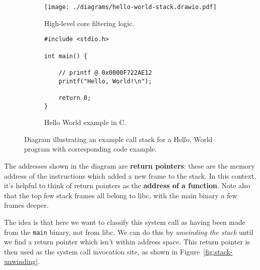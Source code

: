\begin{figure}[h]
    \centering %

    \begin{subfigure}[b]{0.48\linewidth} %
        \centering %
        \texttt{[image: ./diagrams/hello-world-stack.drawio.pdf]}
        \caption{High-level \afg core filtering logic.} %
        \label{subfig:stack-diagram} %
    \end{subfigure}
    \hfill %
    \begin{subfigure}[b]{0.48\linewidth} %
        \centering %
        \begin{verbatim}
#include <stdio.h>

int main() {

    // printf @ 0x0000F722AE12
    printf("Hello, World!\n");    

    return 0;
}
        \end{verbatim}
        \caption{Hello World example in C.} %
        \label{subfig:hello-world-code} %
    \end{subfigure}

    \caption{Diagram illustrating an example call stack for a Hello, World
    program with corresponding code example.}%
    \label{fig:hello-world-stack} %

\end{figure}

The addresses shown in the diagram are \textbf{return pointers}: these are the
memory address of the instructions which added a new frame to the stack. In this
context, it's helpful to think of return pointers as the \textbf{address of a
function}. Note also that the top few stack frames all belong to \ac{libc}, with
the main binary a few frames deeper.

The idea is that here we want to classify this system call as having been made from
the \texttt{main} binary, not from \ac{libc}. We can do this by
\textit{unwinding the stack} until we find a return pointer which isn't within
 address space. This return pointer is then used as the system call
invocation site, as shown in Figure~\ref{fig:stack-unwinding}.

